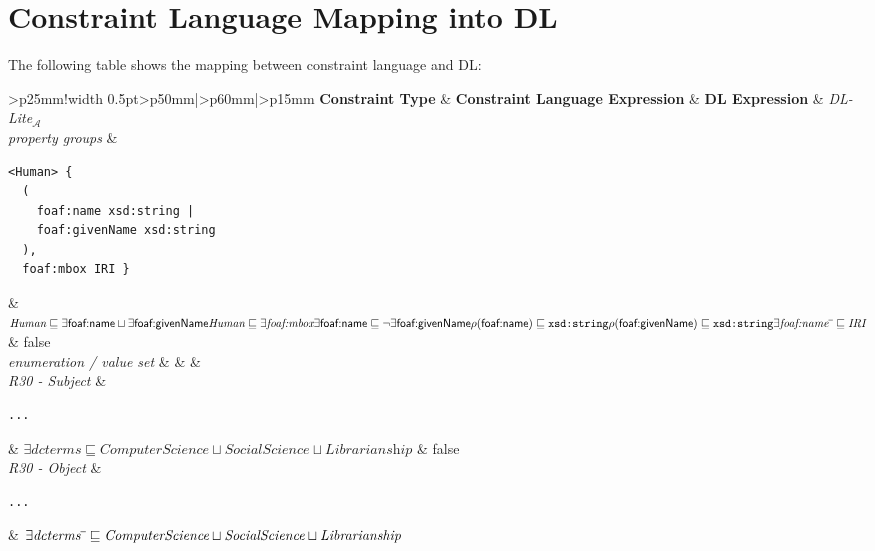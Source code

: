 \section{Constraint Language Mapping into DL}

The following table shows the mapping between constraint language and DL:

\begin{table*}[htb]
\caption{Constraint Language Mapping into DL}
\label{tab:dlmapping}
\centering
\renewcommand{\arraystretch}{1.45}
\begin{tabular}{>{\centering\arraybackslash}p{25mm}!{\vrule width 0.5pt}>{\centering\arraybackslash}p{50mm}|>{\centering\arraybackslash}p{60mm}|>{\centering\arraybackslash}p{15mm}}\toprule
\textbf{Constraint Type} & \textbf{Constraint Language Expression} & \textbf{DL Expression} & \textit{DL-Lite}$_{\mathcal{A}}$ \\ \bottomrule
\textit{property groups}
& \begin{verbatim}<Human> { 
  (
    foaf:name xsd:string | 
    foaf:givenName xsd:string 
  ),
  foaf:mbox IRI }\end{verbatim}
& \flushleft $\textit{Human} \sqsubseteq \exists \textsf{foaf:name} \sqcup \exists \textsf{foaf:givenName} \linebreak \textit{Human} \sqsubseteq  \exists \textit{foaf:mbox} \linebreak \exists \textsf{foaf:name} \sqsubseteq \neg \exists \textsf{foaf:givenName} \linebreak \rho(\textsf{foaf:name}) \sqsubseteq \verb|xsd:string| \linebreak \rho(\textsf{foaf:givenName}) \sqsubseteq \verb|xsd:string| \linebreak \exists \textit{foaf:name}\sp{\overline{\ }} \sqsubseteq \textit{IRI}$
& false \\ \midrule
\textit{enumeration / value set}
& & & \\ \hline
\textit{R30 - Subject}
& \begin{verbatim}...\end{verbatim}
& \flushleft $\exists \textit{dcterms} \sqsubseteq \textit{ComputerScience} \sqcup \textit{SocialScience} \sqcup \textit{Librarianship}$
& false \\ \hline
\textit{R30 - Object}
& \begin{verbatim}...\end{verbatim}
& \flushleft $\exists \textit{dcterms}\sp{\overline{\ }} \sqsubseteq \textit{ComputerScience} \sqcup \textit{SocialScience} \sqcup \textit{Librarianship}$

\end{tabular}
\end{table*}

